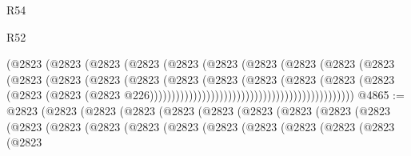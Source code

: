 \begin{lexlean}{R54}
\begin{lexlean}{R52}
\begin{coremodule}
{{{{{{{{{{{{{{{{{{{{{{{{{{{{{{{{{{{{{{{{{{{{{{{{{{{{{{{{{{{{{{{{{{{{{{{{{{{{{{{{{{{{{{{{{{{{{{{{{{{{{{{{{{{{{{{{{{{{{{{{{{{{{{{{{{{{{{{{{{{{{{{{{{{{{{{{{{{{{{{{{{{{{{{{{{{{{{{{{{{{{{{{{{{{{{{{{{{{{{                                                    (@2823
                                                      (@2823
                                                        (@2823
                                                          (@2823
                                                            (@2823
                                                              (@2823
                                                                (@2823
                                                                  (@2823
                                                                    (@2823
                                                                      (@2823
                                                                        (@2823
                                                                          (@2823
                                                                            (@2823
                                                                              (@2823
                                                                                (@2823
                                                                                  (@2823
                                                                                    (@2823
                                                                                      (@2823
                                                                                        (@2823
                                                                                          (@2823
                                                                                            (@2823
                                                                                              (@2823
                                                                                                (@2823
                                                                                                  @226)))))))))))))))))))))))))))))))))))))))))))))))
@4865 := @2823
    (@2823
      (@2823
        (@2823
          (@2823
            (@2823
              (@2823
                (@2823
                  (@2823
                    (@2823
                      (@2823
                        (@2823
                          (@2823
                            (@2823
                              (@2823
                                (@2823
                                  (@2823
                                    (@2823
                                      (@2823
                                        (@2823
                                          (@2823
}}}}}}}}}}}}}}}}}}}}}}}}}}}}}}}}}}}}}}}}}}}}}}}}}}}}}}}}}}}}}}}}}}}}}}}}}}}}}}}}}}}}}}}}}}}}}}}}}}}}}}}}}}}}}}}}}}}}}}}}}}}}}}}}}}}}}}}}}}}}}}}}}}}}}}}}}}}}}}}}}}}}}}}}}}}}}}}}}}}}}}}}}}}}}}}}}}}}}}
\end{coremodule}
\end{lexlean}
\end{lexlean}
